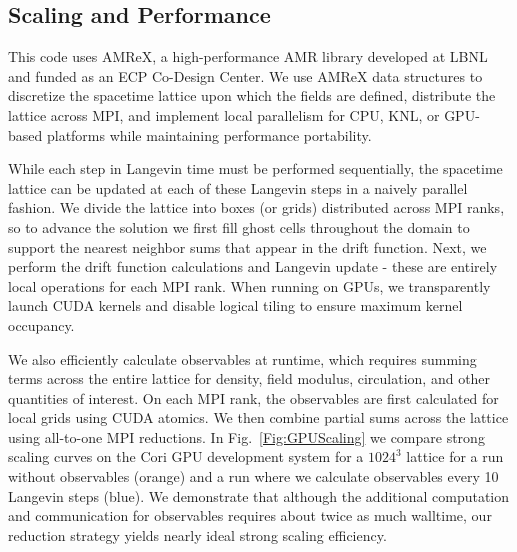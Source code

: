 \documentclass[onecolumn, 12pt]{article}
\begin{document}
\subsection{\label{scaling}Scaling and Performance}
This code uses AMReX, a high-performance AMR library developed at LBNL and funded as an ECP Co-Design Center. We use AMReX data structures to discretize the spacetime lattice upon which the fields are defined, distribute the lattice across MPI, and implement local parallelism for CPU, KNL, or GPU-based platforms while maintaining performance portability. 

While each step in Langevin time must be performed sequentially, the spacetime lattice can be updated at each of these Langevin steps in a naively parallel fashion. We divide the lattice into boxes (or grids) distributed across MPI ranks, so to advance the solution we first fill ghost cells throughout the domain to support the nearest neighbor sums that appear in the drift function. Next, we perform the drift function calculations and Langevin update - these are entirely local operations for each MPI rank. %
When running on GPUs, we transparently launch CUDA kernels and disable logical tiling to ensure maximum kernel occupancy.

We also efficiently calculate observables at runtime, which requires summing terms across the entire lattice for density, field modulus, circulation, and other quantities of interest. On each MPI rank, the observables are first calculated for local grids 
using CUDA atomics. We then combine partial sums across the lattice using all-to-one MPI reductions. In Fig.~\ref{Fig:GPUScaling} we compare strong scaling curves on the Cori GPU development system for a $1024^3$ lattice for a run without observables (orange) and a run where we calculate observables every 10 Langevin steps (blue). We demonstrate that although the additional computation and communication for observables requires about twice as much walltime, our reduction strategy yields nearly ideal strong scaling efficiency.
\end{document}
